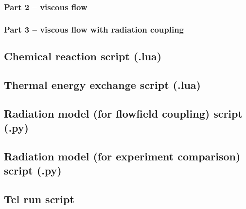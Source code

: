 \subsubsection{Part 2 -- viscous flow}

\topbar

\bottombar

\subsubsection{Part 3 -- viscous flow with radiation coupling}

\topbar

\bottombar

\subsection{Chemical reaction script (.lua)}

\topbar

\bottombar

\subsection{Thermal energy exchange script (.lua)}

\topbar

\bottombar

\subsection{Radiation model (for flowfield coupling) script (.py)}

\topbar

\bottombar

\subsection{Radiation model (for experiment comparison) script (.py)}

\topbar

\bottombar

\subsection{Tcl run script}
\topbar

\bottombar

